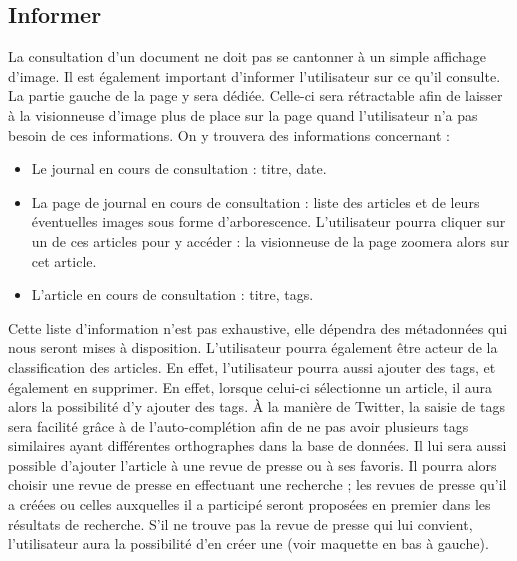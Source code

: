 \subsection{Informer}
\label{sec:consultation_informer}
	La consultation d’un document ne doit pas se cantonner à un simple affichage d’image. Il est également important d’informer l’utilisateur sur ce qu’il consulte. La partie gauche de la page y sera dédiée. Celle-ci sera rétractable afin de laisser à la visionneuse d'image plus de place sur la page quand l'utilisateur n'a pas besoin de ces informations.
On y trouvera des informations concernant :
\begin{itemize}
\item Le journal en cours de consultation : titre, date.
\item La page de journal en cours de consultation : liste des articles et de leurs éventuelles images sous forme d'arborescence. L'utilisateur pourra cliquer sur un de ces articles pour y accéder : la visionneuse de la page zoomera alors sur cet article.
\item L’article en cours de consultation : titre, tags.
\end{itemize}
\bigskip
\par
	Cette liste d’information n’est pas exhaustive, elle dépendra des métadonnées qui nous seront mises à disposition.
	L’utilisateur pourra également être acteur de la classification des articles. En effet, l'utilisateur pourra aussi ajouter des tags, et également en supprimer. En effet, lorsque celui-ci sélectionne un article, il aura alors la possibilité d'y ajouter des tags. À la manière de Twitter, la saisie de tags sera facilité grâce à de l'auto-complétion afin de ne pas avoir plusieurs tags similaires ayant différentes orthographes dans la base de données. Il lui sera aussi possible d’ajouter l’article à une revue de presse ou à ses favoris. Il pourra alors choisir une revue de presse en effectuant une recherche ; les revues de presse qu’il a créées ou celles auxquelles il a participé seront proposées en premier dans les résultats de recherche. S’il ne trouve pas la revue de presse qui lui convient, l’utilisateur aura la possibilité d’en créer une (voir maquette en bas à gauche). 

